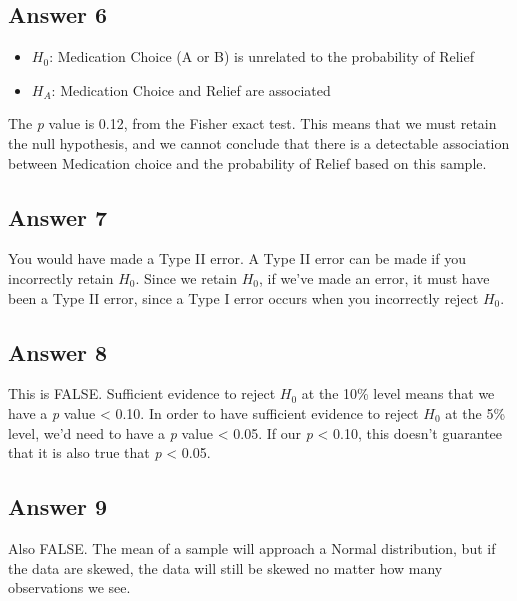 \documentclass[
]{book}
\providecommand{\tightlist}{%
  \setlength{\itemsep}{0pt}\setlength{\parskip}{0pt}}
\begin{document}
\hypertarget{answer-6}{%
\subsection{Answer 6}\label{answer-6}}

\begin{itemize}
\tightlist
\item
  \(H_0\): Medication Choice (A or B) is unrelated to the probability of Relief
\item
  \(H_A\): Medication Choice and Relief are associated
\end{itemize}

The \emph{p} value is 0.12, from the Fisher exact test. This means that we must retain the null hypothesis, and we cannot conclude that there is a detectable association between Medication choice and the probability of Relief based on this sample.

\hypertarget{answer-7}{%
\subsection{Answer 7}\label{answer-7}}

You would have made a Type II error. A Type II error can be made if you incorrectly retain \(H_0\). Since we retain \(H_0\), if we've made an error, it must have been a Type II error, since a Type I error occurs when you incorrectly reject \(H_0\).

\hypertarget{answer-8}{%
\subsection{Answer 8}\label{answer-8}}

This is FALSE. Sufficient evidence to reject \(H_0\) at the 10\% level means that we have a \emph{p} value \textless{} 0.10. In order to have sufficient evidence to reject \(H_0\) at the 5\% level, we'd need to have a \emph{p} value \textless{} 0.05. If our \emph{p} \textless{} 0.10, this doesn't guarantee that it is also true that \emph{p} \textless{} 0.05.

\hypertarget{answer-9}{%
\subsection{Answer 9}\label{answer-9}}

Also FALSE. The mean of a sample will approach a Normal distribution, but if the data are skewed, the data will still be skewed no matter how many observations we see.
\end{document}
